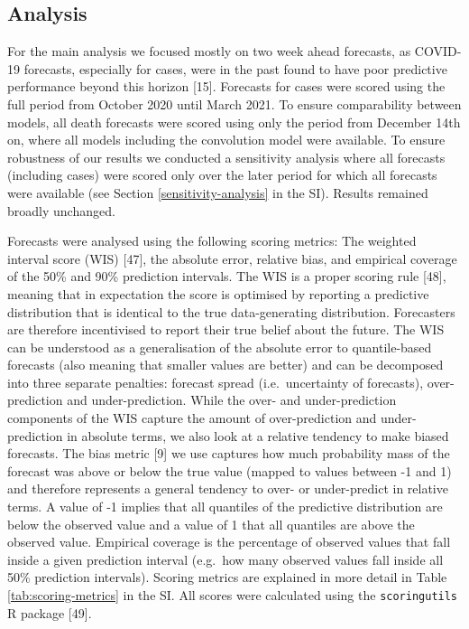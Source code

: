 \documentclass[10pt,letterpaper]{article}
\begin{document}
\hypertarget{analysis}{%
\subsection{Analysis}\label{analysis}}

For the main analysis we focused mostly on two week ahead forecasts, as
COVID-19 forecasts, especially for cases, were in the past found to have
poor predictive performance beyond this horizon {[}15{]}. Forecasts for
cases were scored using the full period from October 2020 until March
2021. To ensure comparability between models, all death forecasts were
scored using only the period from December 14th on, where all models
including the convolution model were available. To ensure robustness of
our results we conducted a sensitivity analysis where all forecasts
(including cases) were scored only over the later period for which all
forecasts were available (see Section \ref{sensitivity-analysis} in the
SI). Results remained broadly unchanged.

Forecasts were analysed using the following scoring metrics: The
weighted interval score (WIS) {[}47{]}, the absolute error, relative
bias, and empirical coverage of the 50\% and 90\% prediction intervals.
The WIS is a proper scoring rule {[}48{]}, meaning that in expectation
the score is optimised by reporting a predictive distribution that is
identical to the true data-generating distribution. Forecasters are
therefore incentivised to report their true belief about the future. The
WIS can be understood as a generalisation of the absolute error to
quantile-based forecasts (also meaning that smaller values are better)
and can be decomposed into three separate penalties: forecast spread
(i.e.~uncertainty of forecasts), over-prediction and under-prediction.
While the over- and under-prediction components of the WIS capture the
amount of over-prediction and under-prediction in absolute terms, we
also look at a relative tendency to make biased forecasts. The bias
metric {[}9{]} we use captures how much probability mass of the forecast
was above or below the true value (mapped to values between -1 and 1)
and therefore represents a general tendency to over- or under-predict in
relative terms. A value of -1 implies that all quantiles of the
predictive distribution are below the observed value and a value of 1
that all quantiles are above the observed value. Empirical coverage is
the percentage of observed values that fall inside a given prediction
interval (e.g.~how many observed values fall inside all 50\% prediction
intervals). Scoring metrics are explained in more detail in Table
\ref{tab:scoring-metrics} in the SI. All scores were calculated using
the \texttt{scoringutils} R package {[}49{]}.
\end{document}
